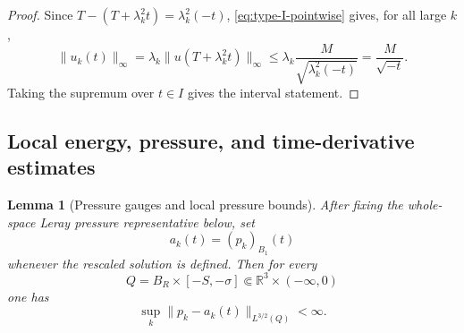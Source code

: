 \documentclass[11pt]{amsart}
\theoremstyle{plain}
\newtheorem{lemma}[theorem]{Lemma}
\theoremstyle{definition}
\theoremstyle{remark}
\numberwithin{equation}{section}
\newcommand{\R}{\mathbb R}
\begin{document}
\begin{proof}
Since \(T-(T+\lambda_k^2t)=\lambda_k^2(-t)\), \eqref{eq:type-I-pointwise}
gives, for all large \(k\),
\[
   \|u_k(t)\|_\infty
   =
   \lambda_k\|u(T+\lambda_k^2t)\|_\infty
   \le
   \lambda_k\frac{M}{\sqrt{\lambda_k^2(-t)}}
   =
   \frac{M}{\sqrt{-t}}.
\]
Taking the supremum over \(t\in I\) gives the interval statement.
\end{proof}

\subsection{Local energy, pressure, and time-derivative estimates}

\begin{lemma}[Pressure gauges and local pressure bounds]\label{lem:pressure}
After fixing the whole-space Leray pressure representative below, set
\[
   a_k(t)=(p_k)_{B_1}(t)
\]
whenever the rescaled solution is defined.  Then for every
\[
   Q=B_R\times[-S,-\sigma]\Subset\R^3\times(-\infty,0)
\]
one has
\[
   \sup_k\|p_k-a_k(t)\|_{L^{3/2}(Q)}<\infty .
\]
\end{lemma}
\end{document}
